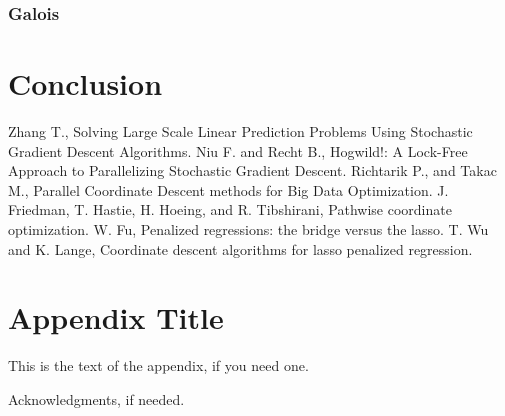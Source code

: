 \documentclass{sigplanconf}
\begin{document}
\subsubsection{Galois}

\section{Conclusion}



\begin{thebibliography}{}
\softraggedright

Zhang T., Solving Large Scale Linear Prediction Problems Using Stochastic Gradient Descent Algorithms.
Niu F. and Recht B., Hogwild!: A Lock-Free Approach to Parallelizing Stochastic Gradient Descent.
Richtarik P., and Takac M., Parallel Coordinate Descent methods for Big Data Optimization.
J. Friedman, T. Hastie, H. Hoeing, and R. Tibshirani, Pathwise coordinate optimization.
W. Fu, Penalized regressions: the bridge versus the lasso.
T. Wu and K. Lange, Coordinate descent algorithms for lasso penalized regression.

\end{thebibliography}

\appendix

\section{Appendix Title}

This is the text of the appendix, if you need one.

\acks

Acknowledgments, if needed.
\end{document}
